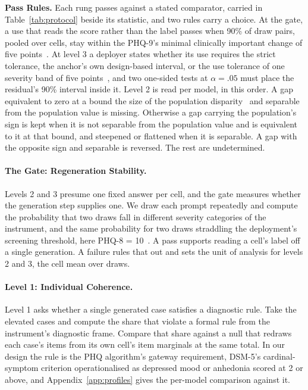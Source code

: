 \documentclass[wcp]{jmlr}
\let\cite\citep
\begin{document}
\textbf{Pass Rules.} Each rung passes against a stated comparator, carried in
Table~\ref{tab:protocol} beside its statistic, and two rules carry a choice. At the gate, a use
that reads the score rather than the label passes when 90\% of draw pairs, pooled over cells, stay within the PHQ-9's minimal clinically important change of five points~\cite{lowe2004monitoring}. At level 3 a deployer states whether its use requires the strict tolerance, the anchor's own design-based interval, or the use tolerance of one severity band of five points~\cite{kroenke2009phq8,vancalster2019calibration}, and two one-sided tests at $\alpha = .05$ must place the residual's 90\% interval inside it. Level 2 is read per model, in this order. A gap equivalent to zero at a bound the size of the population disparity~\cite{lakens2017equivalence} and separable from the population value is missing. Otherwise a gap carrying the population's sign is kept when it is not separable from the population value and is equivalent to it at that bound, and steepened or flattened when it is separable. A gap with the opposite sign and separable is reversed. The rest are undetermined.

\paragraph{The Gate: Regeneration Stability.}
\label{sec:gate}
Levels 2 and 3 presume one fixed answer per cell, and the gate measures whether the generation
step supplies one. We draw each prompt repeatedly and
compute the probability that two draws fall in different severity categories of the instrument,
and the same probability for two draws straddling the deployment's screening threshold, here
PHQ-8 = 10~\cite{kroenke2002severity,kroenke2009phq8}. A pass supports reading a cell's label off a single generation. A failure rules that out and sets the unit of analysis for levels 2 and 3, the cell mean over draws.

\paragraph{Level 1: Individual Coherence.}
\label{sec:l1}
Level 1 asks whether a single generated case satisfies a diagnostic rule. Take the elevated cases and compute the share that violate a formal rule from the instrument's
diagnostic frame. Compare that share against a null that
redraws each case's items from its own cell's item marginals at the same total. In our design
the rule is the PHQ algorithm's gateway requirement, DSM-5's cardinal-symptom criterion
operationalised as depressed mood or anhedonia scored at 2 or above, and Appendix~\ref{app:profiles} gives the per-model comparison against it.
\end{document}
